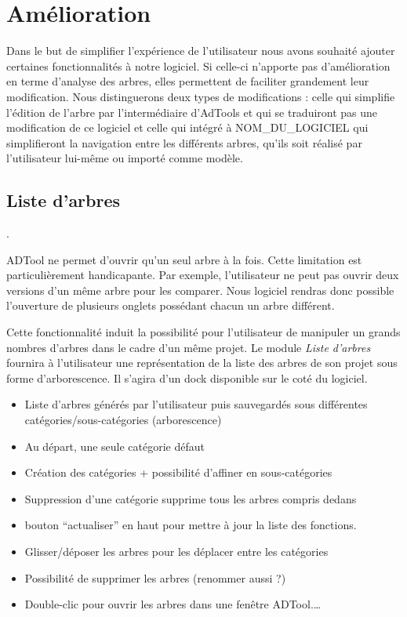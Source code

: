 \section{Amélioration}

	Dans le but de simplifier l'expérience de l'utilisateur nous avons souhaité ajouter certaines fonctionnalités à notre logiciel. Si celle-ci n'apporte pas d'amélioration en terme d'analyse des arbres, elles permettent de faciliter grandement leur modification. Nous distinguerons deux types de modifications : celle qui simplifie l'édition de l'arbre par l’intermédiaire d'AdTools et qui se traduiront pas une modification de ce logiciel et celle qui intégré à NOM_DU_LOGICIEL qui simplifieront la navigation entre les différents arbres, qu'ils soit réalisé par l'utilisateur lui-même ou importé comme modèle. 



	\subsection{Liste d'arbres}.

		ADTool ne permet d'ouvrir qu'un seul arbre à la fois. Cette limitation est particulièrement handicapante. Par exemple, l'utilisateur ne peut pas ouvrir deux versions d'un même arbre pour les comparer. Nous logiciel rendras donc possible l'ouverture de plusieurs onglets possédant chacun un arbre différent. 

		Cette fonctionnalité induit la possibilité pour l'utilisateur de manipuler un grands nombres d'arbres dans le cadre d'un même projet. Le module \emph{Liste d'arbres} fournira à l'utilisateur une représentation de la liste des arbres de son projet sous forme d'arborescence. Il s'agira d'un dock disponible sur le coté du logiciel.

		\begin{itemize}
			\item Liste d'arbres générés par l'utilisateur puis sauvegardés sous différentes catégories/sous-catégories (arborescence)
			\item Au départ, une seule catégorie défaut
			\item  Création des catégories + possibilité d'affiner en sous-catégories
			\item Suppression d'une catégorie supprime tous les arbres compris dedans
			\item bouton “actualiser” en haut pour mettre à jour la liste des fonctions.
			\item Glisser/déposer les arbres pour les déplacer entre les catégories
			\item Possibilité de supprimer les arbres (renommer aussi ?)
			\item Double-clic pour ouvrir les arbres dans une fenêtre ADTool.\ldots
		\end{itemize}
		


